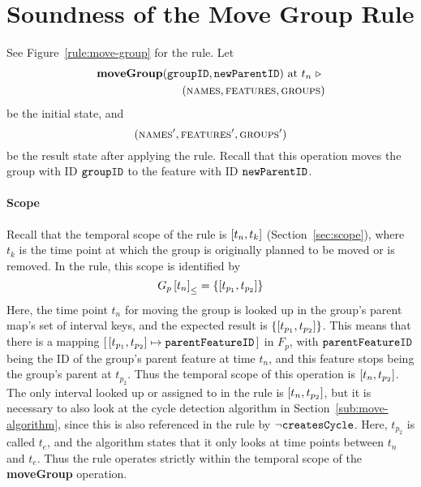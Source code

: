 
\section{Soundness of the Move Group Rule}
\label{sec:soundness-of-the-move-group-rule}

See Figure~\vref{rule:move-group} for the  rule. Let 
\begin{equation*}
   \begin{split}
      \textbf{moveGroup}(\texttt{groupID}, \texttt{newParentID}) \text{ at } t_n \ \triangleright \  \\
      (\textsc{names}, \textsc{features}, \textsc{groups}{})
   \end{split}
\end{equation*}
be the initial state, and
\[
   (\textsc{names}', \textsc{features}', \textsc{groups}{}')
\]
be the result state after applying the  rule. Recall that this operation moves the group with ID $\texttt{groupID}$ to the feature with ID $\texttt{newParentID}$.

\paragraph{Scope}
Recall that the temporal scope of the  rule is $\interval{t_n}{t_k}$ (Section~\vref{sec:scope}), where $t_k$ is the time point at which the group is originally planned to be moved or is removed. In the rule, this scope is identified by 
   \[
      \containing{G_p}{t_n} = \set{\interval{t_{p_1}}{t_{p_2}}}
   \]
   Here, the time point $t_n$ for moving the group is looked up in the group's parent map's set of interval keys, and the expected result is $\set{\interval{t_{p_1}}{t_{p_2}}}$. This means that there is a mapping $\intervalmapping{t_{p_1}}{t_{p_2}}{\var{parentFeatureID}}$ in $F_p$, with $\texttt{parentFeatureID}$ being the ID of the group's parent feature at time $t_n$, and this feature stops being the group's parent at $t_{p_2}$. Thus the temporal scope of this operation is $\interval{t_n}{t_{p_2}}$. The only interval looked up or assigned to in the rule is $\interval{t_n}{t_{p_2}}$, but it is necessary to also look at the cycle detection algorithm in Section~\vref{sub:move-algorithm}, since this is also referenced in the rule by $\neg \texttt{createsCycle}$. Here, $t_{p_2}$ is called $t_e$, and the algorithm states that it only looks at time points between $t_n$ and $t_e$. Thus the rule operates strictly within the temporal scope of the \textbf{moveGroup} operation.

